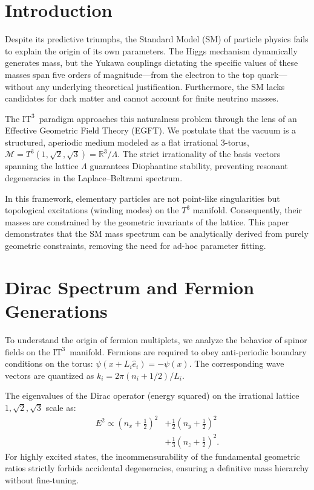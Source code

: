 \documentclass[onecolumn,aps,prd,superscriptaddress,nofootinbib,amsmath,amssymb]{revtex4-2}
\newcommand{\ITthree}{\ensuremath{\mathrm{IT}^3}}
\begin{document}
\section{Introduction}
Despite its predictive triumphs, the Standard Model (SM) of particle physics fails to explain the origin of its own parameters. The Higgs mechanism dynamically generates mass, but the Yukawa couplings dictating the specific values of these masses span five orders of magnitude—from the electron to the top quark—without any underlying theoretical justification. Furthermore, the SM lacks candidates for dark matter and cannot account for finite neutrino masses.

The \ITthree\ paradigm approaches this naturalness problem through the lens of an Effective Geometric Field Theory (EGFT). We postulate that the vacuum is a structured, aperiodic medium modeled as a flat irrational 3-torus, $\mathcal{M} = T^3(1,\sqrt{2},\sqrt{3}) = \mathbb{R}^3/\Lambda$. The strict irrationality of the basis vectors spanning the lattice $\Lambda$ guarantees Diophantine stability, preventing resonant degeneracies in the Laplace--Beltrami spectrum. 

In this framework, elementary particles are not point-like singularities but topological excitations (winding modes) on the $T^3$ manifold. Consequently, their masses are constrained by the geometric invariants of the lattice. This paper demonstrates that the SM mass spectrum can be analytically derived from purely geometric constraints, removing the need for ad-hoc parameter fitting.

\section{Dirac Spectrum and Fermion Generations}
To understand the origin of fermion multiplets, we analyze the behavior of spinor fields on the \ITthree\ manifold. Fermions are required to obey anti-periodic boundary conditions on the torus: $\psi(x+L_i \hat{e}_i) = -\psi(x)$. The corresponding wave vectors are quantized as $k_i = 2\pi(n_i+1/2)/L_i$.

The eigenvalues of the Dirac operator (energy squared) on the irrational lattice $1,\sqrt{2},\sqrt{3}$ scale as:
\begin{equation}
\begin{split}
    E^2 \propto \left(n_x + \frac{1}{2}\right)^2 &+ \frac{1}{2}\left(n_y + \frac{1}{2}\right)^2 \\
    &+ \frac{1}{3}\left(n_z + \frac{1}{2}\right)^2.
\end{split}
    \label{eq:dirac_spectrum}
\end{equation}
For highly excited states, the incommensurability of the fundamental geometric ratios strictly forbids accidental degeneracies, ensuring a definitive mass hierarchy without fine-tuning.
\end{document}

